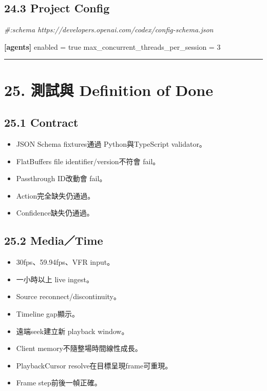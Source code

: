 \documentclass[
  9pt,
  a4paper,
]{article}
\newenvironment{Shaded}{}{}
\newcommand{\CommentTok}[1]{\textcolor[rgb]{0.38,0.63,0.69}{\textit{#1}}}
\newcommand{\ConstantTok}[1]{\textcolor[rgb]{0.53,0.00,0.00}{#1}}
\newcommand{\DataTypeTok}[1]{\textcolor[rgb]{0.56,0.13,0.00}{#1}}
\newcommand{\DecValTok}[1]{\textcolor[rgb]{0.25,0.63,0.44}{#1}}
\newcommand{\KeywordTok}[1]{\textcolor[rgb]{0.00,0.44,0.13}{\textbf{#1}}}
\newcommand{\OperatorTok}[1]{\textcolor[rgb]{0.40,0.40,0.40}{#1}}
\providecommand{\tightlist}{%
  \setlength{\itemsep}{0pt}\setlength{\parskip}{0pt}}
\begin{document}
\subsection{24.3 Project Config}\label{243-project-config}

\begin{Shaded}
\begin{Highlighting}[]
\CommentTok{\#:schema https://developers.openai.com/codex/config{-}schema.json}

\KeywordTok{[agents]}
\DataTypeTok{enabled} \OperatorTok{=} \ConstantTok{true}
\DataTypeTok{max\_\allowbreak{}concurrent\_\allowbreak{}threads\_\allowbreak{}per\_\allowbreak{}session} \OperatorTok{=} \DecValTok{3}
\end{Highlighting}
\end{Shaded}

\begin{center}\rule{0.5\linewidth}{0.5pt}\end{center}

\section{25. 測試與 Definition of
Done}\label{25-ux6e2cux8a66ux8207-definition-of-done}

\subsection{25.1 Contract}\label{251-contract}

\begin{itemize}
\tightlist
\item
  JSON Schema fixtures通過 Python與TypeScript validator。
\item
  FlatBuffers file identifier/version不符會 fail。
\item
  Passthrough ID改動會 fail。
\item
  Action完全缺失仍通過。
\item
  Confidence缺失仍通過。
\end{itemize}

\subsection{25.2 Media／Time}\label{252-mediatime}

\begin{itemize}
\tightlist
\item
  30fps、59.94fps、VFR input。
\item
  一小時以上 live ingest。
\item
  Source reconnect/discontinuity。
\item
  Timeline gap顯示。
\item
  遠端seek建立新 playback window。
\item
  Client memory不隨整場時間線性成長。
\item
  PlaybackCursor resolve在目標呈現frame可重現。
\item
  Frame step前後一幀正確。
\end{itemize}
\end{document}
